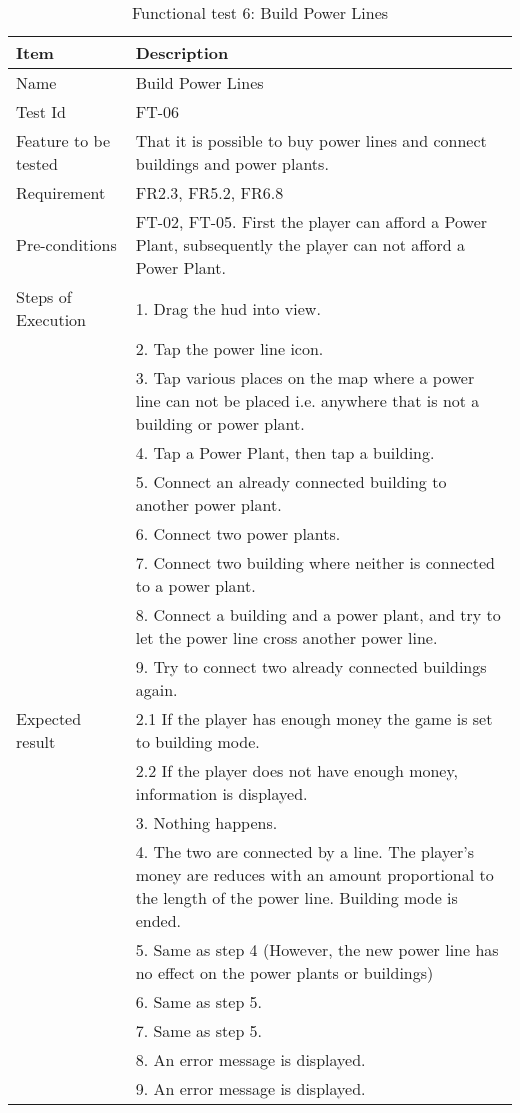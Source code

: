\begin{table}[H]
\centering
	\begin{tabular}{ l | p{8cm} }
		\hline
		\rowcolor{lightgray}
		{\bf Item} & {\bf Description} \\ \hline
		Name & Build Power Lines \\ 
		Test Id & FT-06 \\ 
		Feature to be tested &  That it is possible to buy power lines and connect buildings and power plants. \\ 
		Requirement & FR2.3, FR5.2, FR6.8 \\ 
		Pre-conditions & FT-02, FT-05. First the player can afford a Power Plant, subsequently the player can not afford a Power Plant.\\ 
		Steps of Execution & 1. Drag the hud into view. \\
		& 2. Tap the power line icon. \\
		& 3. Tap various places on the map where a power line can not be placed i.e. anywhere that is not a building or power plant. \\
		& 4. Tap a Power Plant, then tap a building. \\
		& 5. Connect an already connected building to another power plant. \\
		& 6. Connect two power plants. \\
		& 7. Connect two building where neither is connected to a power plant. \\
		& 8. Connect a building and a power plant, and try to let the power line cross another power line. \\
		& 9. Try to connect two already connected buildings again. \\
		Expected result & 2.1 If the player has enough money the game is set to building mode. \\
		& 2.2 If the player does not have enough money, information is displayed. \\
		& 3. Nothing happens. \\
		& 4. The two are connected by a line. The player's money are reduces with an amount proportional to the length of the power line. Building mode is ended. \\
		& 5. Same as step 4 (However, the new power line has no effect on the power plants or buildings) \\
		& 6. Same as step 5. \\
		& 7. Same as step 5. \\
		& 8. An error message is displayed. \\
		& 9. An error message is displayed. \\
		\hline
	\end{tabular}
	\caption{Functional test 6: Build Power Lines}
\end{table}

